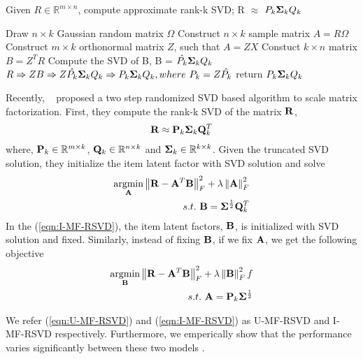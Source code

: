 \begin{algorithm}
  	\small
	\caption{Given $R \in \mathbb{R}^{m \times n}$, compute approximate rank-k SVD; R $\approx$ $P_k \Sig_k Q_k$}
	\label{algo:RSVD}
	\begin{algorithmic}[1]

	\State Draw $n\times k$ Gaussian random matrix $\Omega$
	\State Construct $n\times k$ sample matrix $A = R\Omega$
	\State Construct $m\times k$ orthonormal matrix $Z$, such that $A  = ZX$
	\State Constuct $k\times n$ matrix $B = Z^TR$
	\State Compute the SVD of B, B =  $\hat{P_k} \Sig_k Q_k$
	\State  $R \Rightarrow ZB \Rightarrow Z \hat{P_k} \Sig_k Q_k \Rightarrow  P_k \Sig_k Q_k, where\ P_k = Z \hat{P_k}$
	\State return $P_k \Sig_k Q_k$
	\EndProcedure
	\end{algorithmic}
\end{algorithm}


Recently, ~\citep{Tang:2013} proposed a two step randomized SVD based algorithm to scale matrix factorization. First, they compute the rank-k SVD of the matrix $\R$,
\begin{align*}
	\R \approx \P_k \Sig_k \Q^T_k
\end{align*}
where, $\P_k \in \mathbb{R}^{m \times k}$, $\Q_k \in \mathbb{R}^{n \times k}$ and $\Sig_k \in \mathbb{R}^{k \times k}$. Given the truncated SVD solution, they initialize the item latent factor with SVD solution and solve 
\begin{align}
\label{eqn:I-MF-RSVD}
\begin{split}
\underset{\A}{\mathrm{argmin}}  \left \| \R - \A^T\B\right \|_F^2 + \lambda \left \|  \A \right \|_F^2   \\
s.t.\ \B = \Sig^{\frac{1}{2}} \Q^T_k 
\end{split}
\end{align}
In the (\ref{eqn:I-MF-RSVD}), the item latent factors, $\B$, is initialized with SVD solution and fixed. Similarly, instead of fixing $\B$, if we fix $\A$, we get the following objective 
\begin{align}
\label{eqn:U-MF-RSVD}
\begin{split}
\underset{\B}{\mathrm{argmin}}  \left \| \R - \A^T\B\right \|_F^2 + \lambda \left \|  \B \right \|_F^2 f\\
s.t.\ \A = \P_k \Sig^{\frac{1}{2}}\\
\end{split}
\end{align}

We refer (\ref{eqn:U-MF-RSVD}) and (\ref{eqn:I-MF-RSVD}) as U-MF-RSVD and I-MF-RSVD respectively. Furthermore, we emperically show that the performance varies significantly between these two models .
